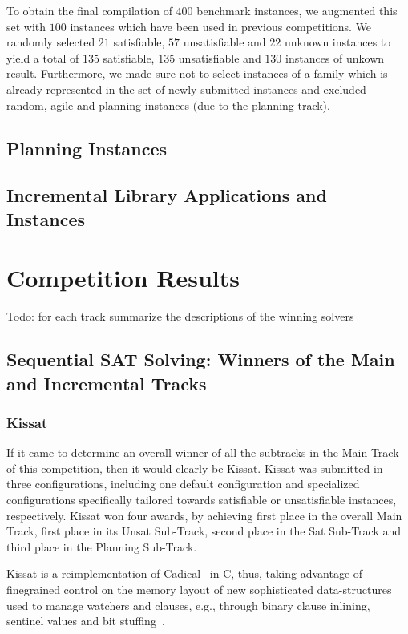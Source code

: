\documentclass{elsarticle}
\newcommand{\todo}[1]{{\color{purple}Todo: #1}}
\begin{document}
To obtain the final compilation of $400$ benchmark instances, we augmented this set with $100$ instances which have been used in previous competitions. 
We randomly selected $21$ satisfiable, $57$ unsatisfiable and $22$ unknown instances to yield a total of $135$ satisfiable, $135$ unsatisfiable and $130$ instances of unkown result. 
Furthermore, we made sure not to select instances of a family which is already represented in the set of newly submitted instances and excluded random, agile and planning instances (due to the planning track). 


\subsection{Planning Instances}

\subsection{Incremental Library Applications and Instances}


\section{Competition Results}
\label{sec:results}
\todo{for each track summarize the descriptions of the winning solvers}

\subsection{Sequential SAT Solving: Winners of the Main and Incremental Tracks}

\subsubsection{Kissat} 

If it came to determine an overall winner of all the subtracks in the Main Track of this competition, then it would clearly be Kissat. 
Kissat was submitted in three configurations, including one default configuration and specialized configurations specifically tailored towards satisfiable or unsatisfiable instances, respectively.
Kissat won four awards, by achieving first place in the overall Main Track, first place in its Unsat Sub-Track, second place in the Sat Sub-Track and third place in the Planning Sub-Track. 

Kissat is a reimplementation of Cadical~\cite{Biere:SC2019} in C, thus, taking advantage of finegrained control on the memory layout of new sophisticated data-structures used to manage watchers and clauses, e.g., through binary clause inlining, sentinel values and bit stuffing~\cite{Biere:SC2020}. 
\end{document}
